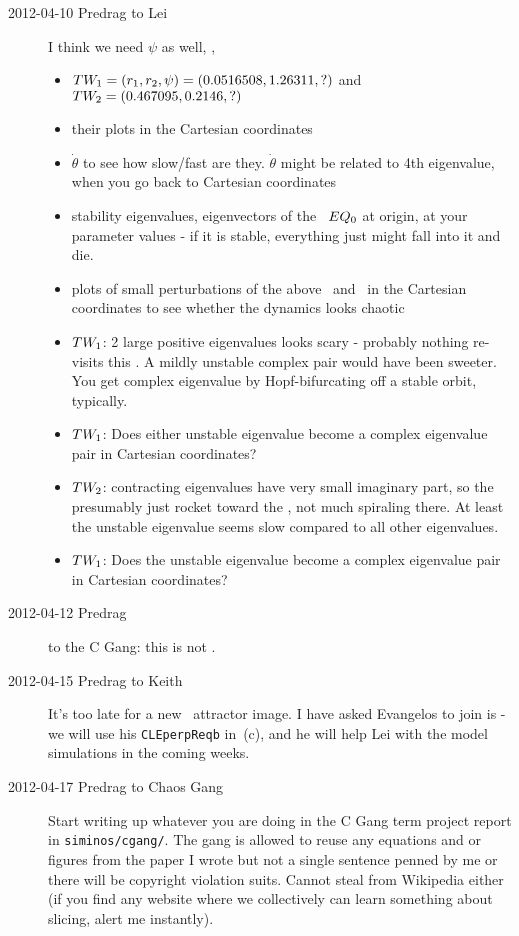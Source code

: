 \begin{description}
\item[2012-04-10 Predrag to Lei] I think we need $\psi$ as well, \ie,
\begin{itemize}
  \item $TW_{1} = (r_1,r_2,\psi)=(0.0516508, 1.26311,?)$ and
        $TW_{2} = (0.467095,0.2146,?)$
  \item their plots in the Cartesian coordinates
  \item $\dot{\theta}$ to see how slow/fast are they. $\dot{\theta}$
        might be related to 4th eigenvalue, when you go back
        to Cartesian coordinates
  \item stability eigenvalues, eigenvectors of the \eqv\ $EQ_{0}$ at
        origin, at your parameter values - if it is stable, everything
        just might fall into it and die.
  \item plots of small perturbations of the above \eqv\ and \reqva\ in
        the Cartesian coordinates to see whether the dynamics looks
        chaotic
  \item $TW_{1}$: 2 large positive eigenvalues looks scary - probably
        nothing re-visits this \reqv. A mildly unstable complex pair
        would have been sweeter. You get complex eigenvalue by Hopf-bifurcating off a
        stable orbit, typically.
  \item $TW_{1}$: Does either unstable eigenvalue become a complex
        eigenvalue pair in Cartesian coordinates?
  \item $TW_{2}$: contracting eigenvalues have very small imaginary
        part, so the presumably just rocket toward the \reqv, not much
        spiraling there. At least the unstable eigenvalue seems slow
        compared to all other eigenvalues.
  \item $TW_{1}$: Does the unstable eigenvalue become a complex
        eigenvalue pair in Cartesian coordinates?
\end{itemize}

\item[2012-04-12 Predrag] to the C Gang: this is not
.

\item[2012-04-15 Predrag to Keith] It's too late for a new \cLe\
attractor image. I have asked Evangelos to join is - we will use his
\texttt{CLEperpReqb} in \reffig{fig:CLf01group}\,(c), and he will help
Lei with the {\twoMode} model simulations in the coming weeks.

\item[2012-04-17 Predrag to Chaos Gang]
Start writing up whatever you are doing in the C Gang term project report
in \texttt{siminos/cgang/}. The gang is allowed to reuse any equations
and or figures from the paper I wrote\rf{atlas12} but not a single
sentence penned by me or there will be copyright violation suits. Cannot
steal from Wikipedia either (if you find any website where we
collectively can learn something about slicing, alert me instantly).



\end{description}
